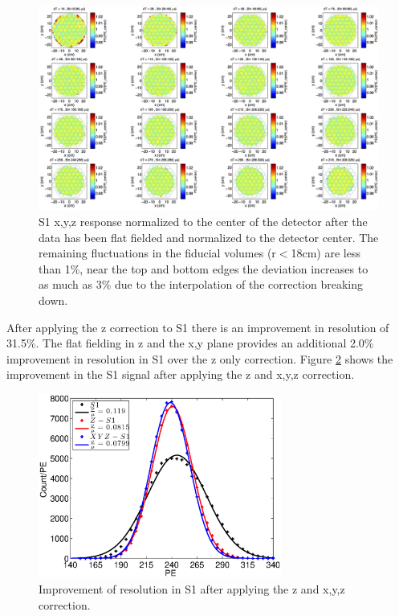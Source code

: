 \begin{figure}[h!]\centering
\includegraphics[width=150mm]{Chapter_XYZ_Corr/Thesis_Corr_Plots/S1_XYZ_Kr_FlatField_norm_center_crop.png}
\caption{S1 x,y,z response normalized to the center of the detector after the data has been flat fielded and normalized to the detector center. The remaining fluctuations in the fiducial volumes (r$<$18cm) are less than 1\%, near the top and bottom edges  the deviation increases to as much as 3\% due to the interpolation of the correction breaking down.}
\label{fig:S1_XYZ_norm_center}
\end{figure}

After applying the z correction to S1 there is an improvement in resolution of 31.5\%. The flat fielding in z and the x,y plane provides an additional 2.0\% improvement in resolution in S1 over the z only correction. Figure \ref{fig:S1_res} shows the improvement in the S1 signal after applying the z and x,y,z correction.

\begin{figure}[h!]\centering
\includegraphics[width=80mm]{Chapter_XYZ_Corr/Thesis_Corr_Plots/S1_corr_res.eps}
\caption{Improvement of resolution in S1 after applying the z and x,y,z correction. }
\label{fig:S1_res}
\end{figure}


